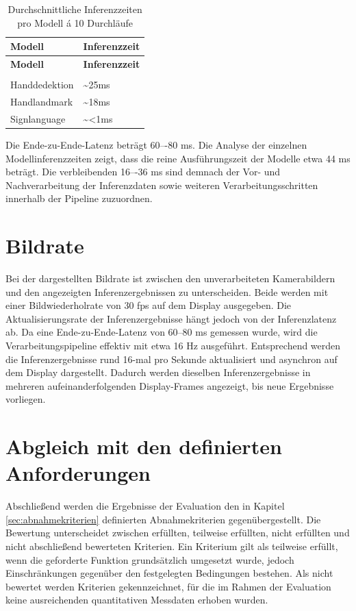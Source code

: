 \begin{longtable}{|p{}|p{}|}
    \hline
    \textbf{Modell} & \textbf{Inferenzzeit} \\
    \hline
    \endfirsthead
    \hline
    \textbf{Modell} & \textbf{Inferenzzeit} \\
    \hline
    \endhead
    \caption{Durchschnittliche Inferenzzeiten pro Modell á 10 Durchläufe}
    \label{tab:inferenzzeiten} \\
    \endlastfoot
    Handdedektion & \textasciitilde 25ms \\
    \hline
    Handlandmark & \textasciitilde  18ms \\
    \hline
    Signlanguage & \textasciitilde <1ms \\
    \hline
\end{longtable}

Die Ende-zu-Ende-Latenz beträgt 60–-80 ms. Die Analyse der einzelnen Modellinferenzzeiten zeigt, dass die reine Ausführungszeit der Modelle etwa 44 ms beträgt. Die verbleibenden 16–-36 ms sind demnach der Vor- und Nachverarbeitung der Inferenzdaten sowie weiteren Verarbeitungsschritten innerhalb der Pipeline zuzuordnen.

\section{Bildrate}\label{sec:bildrate}

Bei der dargestellten Bildrate ist zwischen den unverarbeiteten Kamerabildern und den angezeigten Inferenzergebnissen zu unterscheiden. Beide werden mit einer Bildwiederholrate von 30 fps auf dem Display ausgegeben. Die Aktualisierungsrate der Inferenzergebnisse hängt jedoch von der Inferenzlatenz ab. Da eine Ende-zu-Ende-Latenz von 60–80 ms gemessen wurde, wird die Verarbeitungspipeline effektiv mit etwa 16 Hz ausgeführt. Entsprechend werden die Inferenzergebnisse rund 16-mal pro Sekunde aktualisiert und asynchron auf dem Display dargestellt. Dadurch werden dieselben Inferenzergebnisse in mehreren aufeinanderfolgenden Display-Frames angezeigt, bis neue Ergebnisse vorliegen.

\section{Abgleich mit den definierten Anforderungen}\label{sec:abgleich-anforderungen}

Abschließend werden die Ergebnisse der Evaluation den in Kapitel \ref{sec:abnahmekriterien} definierten Abnahmekriterien gegenübergestellt. Die Bewertung unterscheidet zwischen erfüllten, teilweise erfüllten, nicht erfüllten und nicht abschließend bewerteten Kriterien. Ein Kriterium gilt als teilweise erfüllt, wenn die geforderte Funktion grundsätzlich umgesetzt wurde, jedoch Einschränkungen gegenüber den festgelegten Bedingungen bestehen. Als nicht bewertet werden Kriterien gekennzeichnet, für die im Rahmen der Evaluation keine ausreichenden quantitativen Messdaten erhoben wurden.

